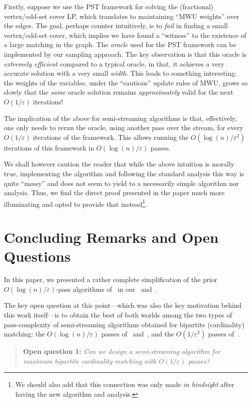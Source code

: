 \documentclass{article}
\newcommand{\eps}{\varepsilon}
\begin{document}
Firstly, suppose we use the PST framework for solving the (fractional) vertex/odd-set cover LP, which translates
to maintaining ``MWU weights'' over the edges. The goal, perhaps counter intuitively, is to \emph{fail} in finding a small vertex/odd-set cover, which implies
we have found a ``witness'' to the existence of a large matching in the graph. The \emph{oracle} used for the PST framework
can be implemented by our sampling approach. The key observation is that this oracle is \emph{extremely efficient} compared to a typical oracle, in that, it achieves a very accurate solution with a very small \emph{width}. This leads
to something interesting: the weights of the variables, under the ``cautious'' update rules of MWU, grows so slowly that the \emph{same} oracle solution remains \emph{approximately} valid for the next $O(1/\eps)$ iterations! 

The implication of the above for semi-streaming algorithms is that, effectively, one only needs to 
rerun the oracle, using another pass over the stream, for every $O(1/\eps)$ iterations of the framework. This allows running the $O(\log{\!(n)}/\eps^2)$ iterations of this framework in $O(\log{\!(n)}/\eps)$ passes. 

We shall however caution the reader that while the above intuition is morally true, implementing the algorithm and following the standard analysis this way is quite ``messy'' and does not seem to yield to a necessarily simple algorithm nor analysis. 
Thus, we find the direct proof presented in the paper much more illuminating and opted to provide that instead\footnote{We should also add that this connection was  only made \emph{in hindsight} after having the new algorithm and analysis.}. 


\section{Concluding Remarks and Open Questions}\label{sec:concluding}

In this paper, we presented a rather complete simplification of the prior $O(\log{\!(n)}/\eps)$-pass algorithms of~\cite{AhnG15} in our~ and~. 

The key open question at this point---which was also the key motivation behind this work itself---is to obtain the best of both worlds among the two types of pass-complexity of semi-streaming algorithms obtained for bipartite (cardinality) matching: the $O(\log{\!(n)}/\eps)$ passes of~\cite{AhnG15,AssadiJJST22} and~, and the $O(1/\eps^2)$ passes of~\cite{AhnG11,AssadiLT21}. 
\begin{quote}
	\textbf{Open question 1:} \emph{Can we design a semi-streaming algorithm for maximum bipartite cardinality matching with $O(1/\eps)$ passes?}
\end{quote}
\end{document}
